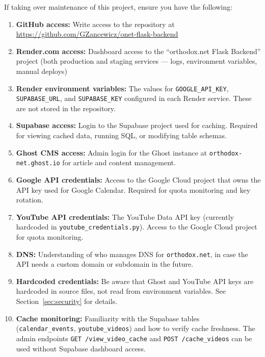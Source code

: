 \documentclass[12pt]{article}
\begin{document}
If taking over maintenance of this project, ensure you have the following:

\begin{enumerate}
    \item \textbf{GitHub access:} Write access to the repository at\\
    \url{https://github.com/GZancewicz/onet-flask-backend}

    \item \textbf{Render.com access:} Dashboard access to the ``orthodox.net Flask Backend'' project (both production and staging services --- logs, environment variables, manual deploys)

    \item \textbf{Render environment variables:} The values for \texttt{GOOGLE\_API\_KEY}, \texttt{SUPABASE\_URL}, and \texttt{SUPABASE\_KEY} configured in each Render service. These are not stored in the repository.

    \item \textbf{Supabase access:} Login to the Supabase project used for caching. Required for viewing cached data, running SQL, or modifying table schemas.

    \item \textbf{Ghost CMS access:} Admin login for the Ghost instance at \texttt{orthodox-net.ghost.io} for article and content management.

    \item \textbf{Google API credentials:} Access to the Google Cloud project that owns the API key used for Google Calendar. Required for quota monitoring and key rotation.

    \item \textbf{YouTube API credentials:} The YouTube Data API key (currently hardcoded in \texttt{youtube\_credentials.py}). Access to the Google Cloud project for quota monitoring.

    \item \textbf{DNS:} Understanding of who manages DNS for \texttt{orthodox.net}, in case the API needs a custom domain or subdomain in the future.

    \item \textbf{Hardcoded credentials:} Be aware that Ghost and YouTube API keys are hardcoded in source files, not read from environment variables. See Section~\ref{sec:security} for details.

    \item \textbf{Cache monitoring:} Familiarity with the Supabase tables (\texttt{calendar\_events}, \texttt{youtube\_videos}) and how to verify cache freshness. The admin endpoints \texttt{GET /view\_video\_cache} and \texttt{POST /cache\_videos} can be used without Supabase dashboard access.
\end{enumerate}
\end{document}
